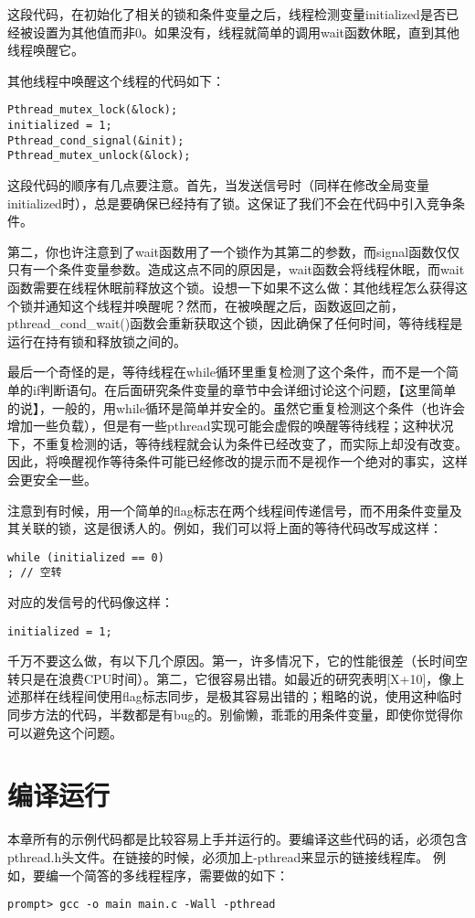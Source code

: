 这段代码，在初始化了相关的锁和条件变量之后，线程检测变量initialized是否已经被设置为其他值而非0。如果没有，线程就简单的调用wait函数休眠，直到其他线程唤醒它。

其他线程中唤醒这个线程的代码如下：
\begin{verbatim}
Pthread_mutex_lock(&lock);
initialized = 1;
Pthread_cond_signal(&init);
Pthread_mutex_unlock(&lock);
\end{verbatim}

这段代码的顺序有几点要注意。首先，当发送信号时（同样在修改全局变量initialized时），总是要确保已经持有了锁。这保证了我们不会在代码中引入竞争条件。

第二，你也许注意到了wait函数用了一个锁作为其第二的参数，而signal函数仅仅只有一个条件变量参数。造成这点不同的原因是，wait函数会将线程休眠，而wait函数需要在线程休眠前释放这个锁。设想一下如果不这么做：其他线程怎么获得这个锁并通知这个线程并唤醒呢？然而，在被唤醒之后，函数返回之前，pthread\_cond\_wait()函数会重新获取这个锁，因此确保了任何时间，等待线程是运行在持有锁和释放锁之间的。

最后一个奇怪的是，等待线程在while循环里重复检测了这个条件，而不是一个简单的if判断语句。在后面研究条件变量的章节中会详细讨论这个问题，【这里简单的说】，一般的，用while循环是简单并安全的。虽然它重复检测这个条件（也许会增加一些负载），但是有一些pthread实现可能会虚假的唤醒等待线程；这种状况下，不重复检测的话，等待线程就会认为条件已经改变了，而实际上却没有改变。因此，将唤醒视作等待条件可能已经修改的提示而不是视作一个绝对的事实，这样会更安全一些。

注意到有时候，用一个简单的flag标志在两个线程间传递信号，而不用条件变量及其关联的锁，这是很诱人的。例如，我们可以将上面的等待代码改写成这样：
\begin{verbatim}
while (initialized == 0)
; // 空转
\end{verbatim}

对应的发信号的代码像这样：
\begin{verbatim}
initialized = 1;
\end{verbatim}

千万不要这么做，有以下几个原因。第一，许多情况下，它的性能很差（长时间空转只是在浪费CPU时间）。第二，它很容易出错。如最近的研究表明[X+10]，像上述那样在线程间使用flag标志同步，是极其容易出错的；粗略的说，使用这种临时同步方法的代码，半数都是有bug的。别偷懒，乖乖的用条件变量，即使你觉得你可以避免这个问题。

\section{编译运行}
本章所有的示例代码都是比较容易上手并运行的。要编译这些代码的话，必须包含pthread.h头文件。在链接的时候，必须加上-pthread来显示的链接线程库。
例如，要编一个简答的多线程程序，需要做的如下：
\begin{verbatim}
prompt> gcc -o main main.c -Wall -pthread
\end{verbatim}


